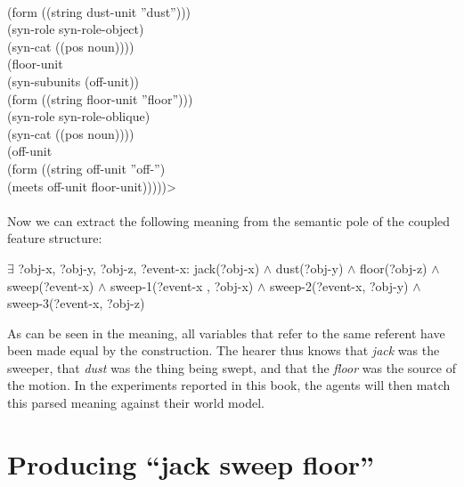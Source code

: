 {{\\ \hspace*{5mm} (form ((string dust-unit ''dust'')))
\\ \hspace*{5mm} (syn-role syn-role-object)
\\ \hspace*{5mm} (syn-cat ((pos noun))))
\\ \hspace*{2mm}(floor-unit
\\ \hspace*{5mm} (syn-subunits (off-unit))
\\ \hspace*{5mm} (form ((string floor-unit ''floor'')))
\\ \hspace*{5mm} (syn-role syn-role-oblique)
\\ \hspace*{5mm} (syn-cat ((pos noun))))
\\ \hspace*{2mm}(off-unit
\\ \hspace*{5mm} (form ((string off-unit ''off-'') 
\\ \hspace*{19mm} (meets off-unit floor-unit)))))>}}
\\
\\
Now we can extract the following meaning from the semantic pole of the coupled feature structure:

\ea
$\exists$ ?obj-x, ?obj-y, ?obj-z, ?event-x: jack(?obj-x) $\wedge$ dust(?obj-y) $\wedge$ floor(?obj-z) $\wedge$ sweep(?event-x) $\wedge$ sweep-1(?event-x , ?obj-x) $\wedge$ sweep-2(?event-x, ?obj-y) $\wedge$ sweep-3(?event-x, ?obj-z)
\z

As can be seen in the meaning, all variables that refer to the same referent have been made equal by the construction. The hearer thus knows that {\em jack} was the sweeper, that {\em dust} was the thing being swept, and that the {\em floor} was the source of the motion. In the experiments reported in this book, the agents will then match this parsed meaning against their world model.

\section{Producing ``jack sweep floor''}

